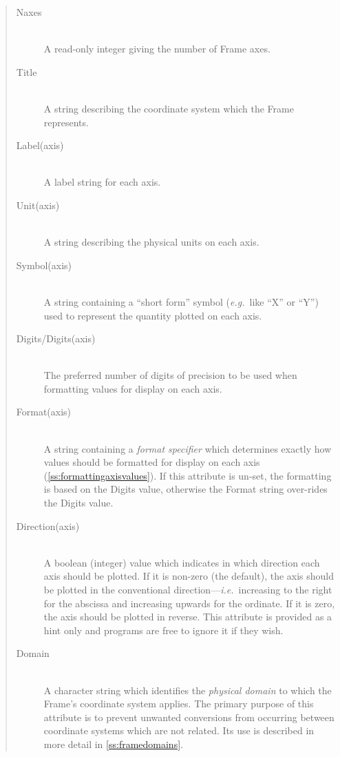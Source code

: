 \documentclass[twoside,11pt]{article}
\newcommand{\secref}[1]{\S\ref{#1}}
\renewcommand{\secref}[1]{\ref{#1}}
\begin{document}
\begin{quote}
\begin{description}
\item[Naxes]\mbox{}\\
A read-only integer giving the number of Frame axes.

\item[Title]\mbox{}\\
A string describing the coordinate system which the Frame represents.

\item[Label(axis)]\mbox{}\\
A label string for each axis.

\item[Unit(axis)]\mbox{}\\
A string describing the physical units on each axis.

\item[Symbol(axis)]\mbox{}\\
A string containing a ``short form'' symbol ({\em{e.g.}}\ like ``X''
or ``Y'') used to represent the quantity plotted on each axis.

\item[Digits/Digits(axis)]\mbox{}\\
The preferred number of digits of precision to be used when formatting
values for display on each axis.

\item[Format(axis)]\mbox{}\\
A string containing a {\em{format specifier}} which determines exactly
how values should be formatted for display on each axis
(\secref{ss:formattingaxisvalues}). If this attribute is un-set, the
formatting is based on the Digits value, otherwise the Format string
over-rides the Digits value.

\item[Direction(axis)]\mbox{}\\
A boolean (integer) value which indicates in which direction each axis
should be plotted. If it is non-zero (the default), the axis should be
plotted in the conventional direction---{\em{i.e.}}\ increasing to the
right for the abscissa and increasing upwards for the ordinate. If it
is zero, the axis should be plotted in reverse.  This attribute is
provided as a hint only and programs are free to ignore it if they
wish.

\item[Domain]\mbox{}\\
A character string which identifies the {\em{physical domain}} to
which the Frame's coordinate system applies. The primary purpose of
this attribute is to prevent unwanted conversions from occurring
between coordinate systems which are not related. Its use is described
in more detail in \secref{ss:framedomains}.
\end{description}
\end{quote}
\end{document}
